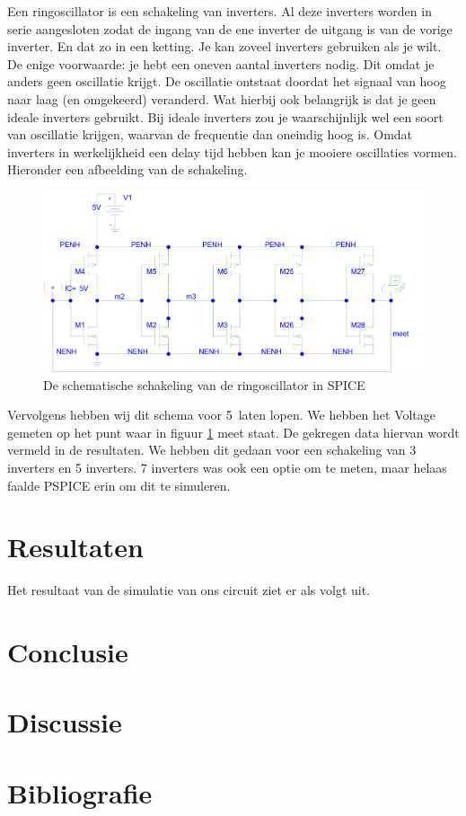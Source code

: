 \documentclass{scrartcl}  %
\begin{document}
Een ringoscillator is een schakeling van inverters. Al deze inverters worden in serie aangesloten zodat de ingang van de ene inverter de uitgang is van de vorige inverter. En dat zo in een ketting. Je kan zoveel inverters gebruiken als je wilt. De enige voorwaarde: je hebt een oneven aantal inverters nodig. Dit omdat je anders geen oscillatie krijgt. De oscillatie ontstaat doordat het signaal van hoog naar laag (en omgekeerd) veranderd. Wat hierbij ook belangrijk is dat je geen ideale inverters gebruikt. Bij ideale inverters zou je waarschijnlijk wel een soort van oscillatie krijgen, waarvan de frequentie dan oneindig hoog is. Omdat inverters in werkelijkheid een delay tijd hebben kan je mooiere oscillaties vormen. Hieronder een afbeelding van de schakeling.
\begin{figure}[H]
\centering
	
	\includegraphics[width=\linewidth]{images/ringoscillator2.png}
	\caption{De schematische schakeling van de ringoscillator in SPICE}
	\label{fig:schema}
\end{figure}
Vervolgens hebben wij dit schema voor 5\nano\second\  laten lopen. We hebben het Voltage gemeten op het punt waar in figuur \ref{fig:schema} meet staat. De gekregen data hiervan wordt vermeld in de resultaten. We hebben dit gedaan voor een schakeling van 3 inverters en 5 inverters. 7 inverters was ook een optie om te meten, maar helaas faalde PSPICE erin om dit te simuleren. 
\section{Resultaten}
Het resultaat van de simulatie van ons circuit ziet er als volgt uit.
\section{Conclusie}


\section{Discussie}


\newpage
{}
\section{Bibliografie}
\printbibliography
\end{document}
